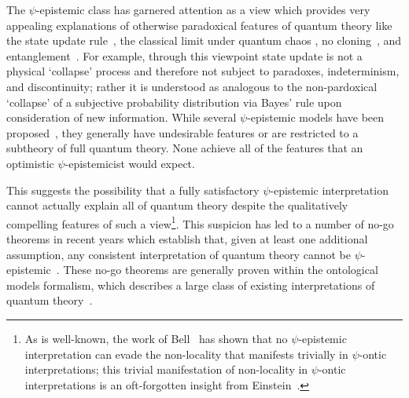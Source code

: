\documentclass[%
 reprint,
superscriptaddress,
nofootinbib,
 amsmath,amssymb,
 prx, 
 accepted=2019-09-27,
]{quantumarticle}
\begin{document}
The $\psi$-epistemic class has garnered attention as a view which
provides very appealing explanations of otherwise paradoxical features
of quantum theory like the state update
rule~\cite{BallentineStatisticalInterpretationQuantum1970}, the
classical limit under quantum chaos
\cite{EmersonQuantumChaosQuantumClassical2002}, no
cloning~\cite{FuchsQuantumMechanicsQuantum2002}, and
entanglement~\cite{GrossHudsonTheoremfinitedimensional2006}. For
example, through this viewpoint state update is not a physical
`collapse' process and therefore not subject to paradoxes,
indeterminism, and discontinuity; rather it is understood as analogous
to the non-pardoxical `collapse' of a subjective probability
distribution via Bayes' rule upon consideration of new information.
While several $\psi$-epistemic models have been
proposed~\cite{KochenProblemHiddenVariables1967,MontinaDynamicsqubitclassical2012,LewisDistinctQuantumStates2012,Aaronsonpsepistemictheoriesrole2013,HarriganRepresentingprobabilisticdata2007,Spekkensdefenseepistemicview2007,WallmanNonnegativesubtheoriesquasiprobability2012},
they generally have undesirable features or are restricted to a
subtheory of full quantum theory.  None achieve all of the features
that an optimistic $\psi$-epistemicist would expect.

This suggests the possibility that a fully satisfactory
$\psi$-epistemic interpretation cannot actually explain all of quantum
theory despite the qualitatively compelling features of such a
view\footnote{As is well-known, the work of
  Bell~\cite{BellProblemHiddenVariables1966} has shown that no
  $\psi$-epistemic interpretation can evade the non-locality that
  manifests trivially in $\psi$-ontic interpretations; this trivial
  manifestation of non-locality in $\psi$-ontic interpretations is an
  oft-forgotten insight from
  Einstein~\cite{HarriganEinsteinincompletenessepistemic2010,HowardEinsteinlocalityseparability1985,EinsteinCanQuantumMechanicalDescription1935}.}. This
suspicion has led to a number of no-go theorems in recent years which
establish that, given at least one additional assumption, any
consistent interpretation of quantum theory cannot be
$\psi$-epistemic~\cite{Puseyrealityquantumstate2012,Aaronsonpsepistemictheoriesrole2013,Colbecksystemwavefunction2017,HardyAREQUANTUMSTATES2013,MansfieldRealityquantumstate2016}.
These no-go theorems are generally proven within the ontological
models formalism, which describes a large class of existing
interpretations of quantum
theory~\cite{SpekkensContextualitypreparationstransformations2005,HarriganOntologicalmodelsinterpretation2007,RudolphOntologicalModelsQuantum2006}.
   
\end{document}
